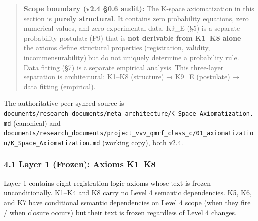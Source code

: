 \documentclass[
  11pt,
]{article}
\begin{document}
\begin{quote}
\textbf{Scope boundary (v2.4 §0.6 audit):} The K-space axiomatization in
this section is \textbf{purely structural}. It contains zero probability
equations, zero numerical values, and zero experimental data. K9\_E (§5)
is a separate probability postulate (P9) that is \textbf{not derivable
from K1--K8 alone} --- the axioms define structural properties
(registration, validity, incommensurability) but do not uniquely
determine a probability rule. Data fitting (§7) is a separate empirical
analysis. This three-layer separation is architectural: K1--K8
(structure) → K9\_E (postulate) → data fitting (empirical).
\end{quote}

The authoritative peer-synced source is
\texttt{documents/research\_documents/meta\_architecture/K\_Space\_Axiomatization.md}
(canonical) and
\texttt{documents/research\_documents/project\_vvv\_qmrf\_class\_c/01\_axiomatization/K\_Space\_Axiomatization.md}
(working copy), both v2.4.

\subsubsection{4.1 Layer 1 (Frozen): Axioms
K1--K8}\label{layer-1-frozen-axioms-k1k8}

Layer 1 contains eight registration-logic axioms whose text is frozen
unconditionally. K1--K4 and K8 carry no Level 4 semantic dependencies.
K5, K6, and K7 have conditional semantic dependencies on Level 4 scope
(when they fire / when closure occurs) but their text is frozen
regardless of Level 4 changes.
\end{document}
